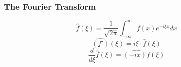 \documentclass{beamer}
\begin{document}
\begin{frame}
\frametitle{The Fourier Transform}
\begin{block}{}
$$\widehat{f}(\xi)=\dfrac{1}{\sqrt{2\pi}}\int_{-\infty}^{\infty}f(x)e^{-i\xi x}dx$$
$$\widehat{(f')}(\xi)=i\xi\cdot\widehat{f}(\xi)$$
$$\dfrac{d}{d\xi}\widehat{f}(\xi)=\widehat{(-ix)f}(\xi)$$
\end{block}
\end{frame}
\end{document}
